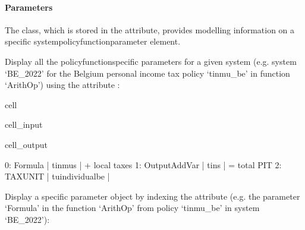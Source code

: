 \documentclass[letterpaper,10pt,english]{sphinxmanual}
\begin{document}
\paragraph{Parameters}
\label{\detokenize{notebooks/userguide:id6}}
\sphinxAtStartPar
The  class, which is stored in the  attribute, provides modelling information on a specific system\sphinxhyphen{}policy\sphinxhyphen{}function\sphinxhyphen{}parameter element.

\sphinxAtStartPar
Display all the policy\sphinxhyphen{}function\sphinxhyphen{}specific parameters for a given system (e.g. system ‘BE\_2022’ for the Belgium personal income tax policy ‘tinmu\_be’ in function ‘ArithOp’) using the attribute :

\begin{sphinxuseclass}{cell}
\begin{sphinxuseclass}{cell_input}
\begin{sphinxVerbatim}[commandchars=\\\{\}]
\PYG{p}{[}\PYG{p}{]}\PYG{p}{[}\PYG{p}{]}\PYG{p}{[}\PYG{p}{]}\PYG{p}{[}\PYG{p}{]}
\end{sphinxVerbatim}

\end{sphinxuseclass}
\begin{sphinxuseclass}{cell_output}
\begin{sphinxVerbatim}[commandchars=\\\{\}]
0: Formula            | tinmu\PYGZus{}s               |    + local taxes 
1: Output\PYGZus{}Add\PYGZus{}Var     | tin\PYGZus{}s                 |    = total PIT 
2: TAX\PYGZus{}UNIT           | tu\PYGZus{}individual\PYGZus{}be      |     
\end{sphinxVerbatim}

\end{sphinxuseclass}
\end{sphinxuseclass}
\sphinxAtStartPar
Display a specific parameter object by indexing the  attribute (e.g. the parameter ‘Formula’ in the function ‘ArithOp’ from policy ‘tinmu\_be’ in system ‘BE\_2022’):
\end{document}
